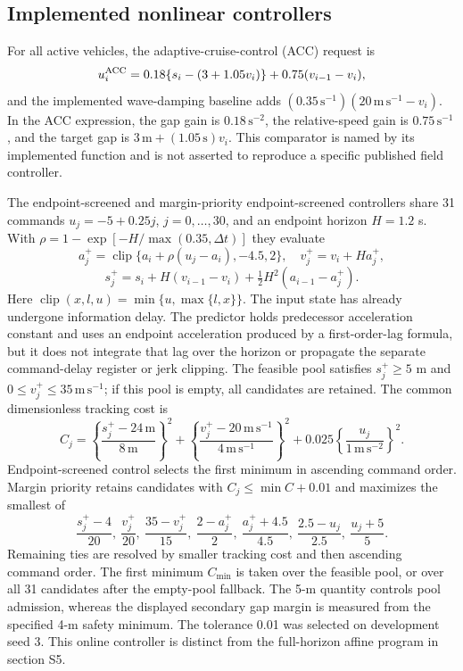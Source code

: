 \documentclass[11pt]{article}
\begin{document}
\subsection*{Implemented nonlinear controllers}
For all active vehicles, the adaptive-cruise-control (ACC) request is
\begin{equation}
u_i^{\rm ACC}=0.18\{s_i-(3+1.05v_i)\}+0.75(v_{i-1}-v_i),
\end{equation}
and the implemented wave-damping baseline adds $(0.35\,\mathrm{s^{-1}})(20\,\mathrm{m\,s^{-1}}-v_i)$. In the ACC expression, the gap gain is $0.18\,\mathrm{s^{-2}}$, the relative-speed gain is $0.75\,\mathrm{s^{-1}}$, and the target gap is $3\,\mathrm m+(1.05\,\mathrm s)v_i$. This comparator is named by its implemented function and is not asserted to reproduce a specific published field controller.

The endpoint-screened and margin-priority endpoint-screened controllers share 31 commands $u_j=-5+0.25j$, $j=0,\ldots,30$, and an endpoint horizon $H=1.2$ s. With $\rho=1-\exp[-H/\max(0.35,\Delta t)]$ they evaluate
\begin{equation}
a_j^+=\operatorname{clip}\{a_i+\rho(u_j-a_i),-4.5,2\},\quad
v_j^+=v_i+Ha_j^+,
\end{equation}
\begin{equation}
s_j^+=s_i+H(v_{i-1}-v_i)+\tfrac12H^2(a_{i-1}-a_j^+).
\end{equation}
Here $\operatorname{clip}(x,l,u)=\min\{u,\max\{l,x\}\}$. The input state has already undergone information delay. The predictor holds predecessor acceleration constant and uses an endpoint acceleration produced by a first-order-lag formula, but it does not integrate that lag over the horizon or propagate the separate command-delay register or jerk clipping. The feasible pool satisfies $s_j^+\geq5$ m and $0\leq v_j^+\leq35\,\mathrm{m\,s^{-1}}$; if this pool is empty, all candidates are retained. The common dimensionless tracking cost is
\begin{equation}
C_j=\left\{\frac{s_j^+-24\,\mathrm m}{8\,\mathrm m}\right\}^2+
\left\{\frac{v_j^+-20\,\mathrm{m\,s^{-1}}}{4\,\mathrm{m\,s^{-1}}}\right\}^2+
0.025\left\{\frac{u_j}{1\,\mathrm{m\,s^{-2}}}\right\}^2.
\end{equation}
Endpoint-screened control selects the first minimum in ascending command order. Margin priority retains candidates with $C_j\leq\min C+0.01$ and maximizes the smallest of
\begin{equation}
\frac{s_j^+-4}{20},\ \frac{v_j^+}{20},\ \frac{35-v_j^+}{15},\
\frac{2-a_j^+}{2},\ \frac{a_j^++4.5}{4.5},\
\frac{2.5-u_j}{2.5},\ \frac{u_j+5}{5}.
\end{equation}
Remaining ties are resolved by smaller tracking cost and then ascending command order. The first minimum $C_{\min}$ is taken over the feasible pool, or over all 31 candidates after the empty-pool fallback. The 5-m quantity controls pool admission, whereas the displayed secondary gap margin is measured from the specified 4-m safety minimum. The tolerance 0.01 was selected on development seed 3. This online controller is distinct from the full-horizon affine program in section S5.
\end{document}
